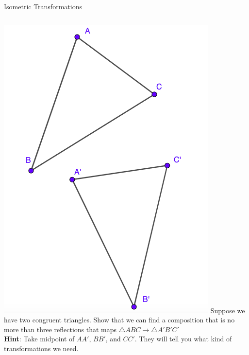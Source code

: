 \documentclass{beamer}
\begin{document}
\begin{frame}{Isometric Transformations}
	\begin{columns}
		\includegraphics[scale=0.3]{cong1.png}
		Suppose we have two congruent triangles. Show that 
		we can find a composition that is no more than 
		three reflections that maps $\triangle ABC\to \triangle
		A'B'C'$\\
		\phantom{Spacing}
		\textbf{Hint}: Take midpoint of $A A'$, $BB'$, and $C C'$.
		They will tell you what kind of transformations we need.
	\end{columns}
\end{frame}
\end{document}
